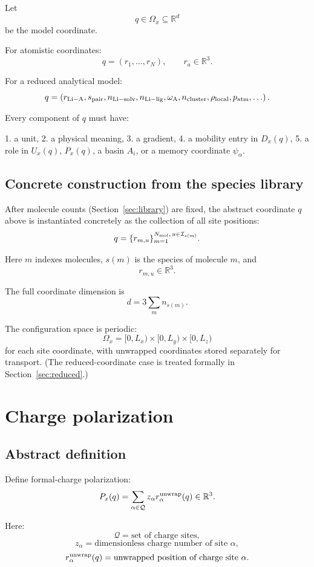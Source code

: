 \documentclass[11pt]{article}
\newcommand{\R}{\mathbb R}
\begin{document}
Let
\[
q\in\Omega_x\subseteq\R^d
\]
be the model coordinate.

For atomistic coordinates:
\[
q=(r_1,\ldots,r_N),
\qquad
r_a\in\R^3.
\]

For a reduced analytical model:
\[
q=
\left(
r_{\rm Li-A},
s_{\rm pair},
n_{\rm Li-solv},
n_{\rm Li-lig},
\omega_{\rm A},
n_{\rm cluster},
\rho_{\rm local},
p_{\rm atm},
\ldots
\right).
\]

Every component of \(q\) must have:

1. a unit,
2. a physical meaning,
3. a gradient,
4. a mobility entry in \(D_x(q)\),
5. a role in \(U_x(q)\), \(P_x(q)\), a basin \(A_i\), or a memory coordinate
\(\psi_\alpha\).

\subsection{Concrete construction from the species library}

After molecule counts (Section~\ref{sec:library}) are fixed, the abstract
coordinate \(q\) above is instantiated concretely as the collection of all
site positions:
\[
q=
\{r_{m,u}\}_{m=1}^{N_{\rm mol},\,u\in\mathcal I_{s(m)}}.
\]

Here \(m\) indexes molecules, \(s(m)\) is the species of molecule \(m\), and
\[
r_{m,u}\in\mathbb R^3.
\]

The full coordinate dimension is
\[
d=3\sum_m n_{s(m)}.
\]

The configuration space is periodic:
\[
\Omega_x=
[0,L_x)\times[0,L_y)\times[0,L_z)
\]
for each site coordinate, with unwrapped coordinates stored separately for
transport. (The reduced-coordinate case is treated formally in
Section~\ref{sec:reduced}.)

\section{Charge polarization}
\label{sec:polarization}

\subsection{Abstract definition}

Define formal-charge polarization:
\[
P_x(q)=\sum_{\alpha\in\mathcal Q} z_\alpha r_\alpha^{\rm unwrap}(q)
\in\R^3.
\]

Here:
\[
\mathcal Q
=
\text{set of charge sites},
\]
\[
z_\alpha
=
\text{dimensionless charge number of site }\alpha,
\]
\[
r_\alpha^{\rm unwrap}(q)
=
\text{unwrapped position of charge site }\alpha.
\]
\end{document}
